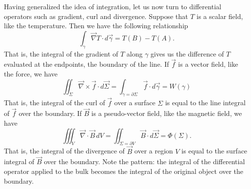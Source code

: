 Having generalized the idea of integration, let us now turn to differential operators such as gradient, curl and divergence. Suppose that $T$ is a scalar field, like the temperature. Then we have the following relationship
\begin{equation}\label{rp-cm-gradientTheorem}
	\int_{\gamma} \vec{\nabla} T \cdot d\vec{\gamma} = T(B) - T(A).
\end{equation}
That is, the integral of the gradient of $T$ along $\gamma$ gives us the difference of $T$ evaluated at the endpoints, the boundary of the line. If $\vec{f}$ is a vector field, like the force, we have
\begin{equation}\label{rp-cm-curlTheorem}
	\iint_{\Sigma} \vec{\nabla} \times \vec{f} \cdot d\vec{\Sigma} = \int_{\gamma = \partial \Sigma} \vec{f} \cdot d\vec{\gamma} = W(\gamma)
\end{equation}
That is, the integral of the curl of $\vec{f}$ over a surface $\Sigma$ is equal to the line integral of $\vec{f}$ over the boundary. If $\vec{B}$ is a pseudo-vector field, like the magnetic field, we have
\begin{equation}\label{rp-cm-divergenceTheorem}
	\iiint_{V} \vec{\nabla} \cdot \vec{B} \, dV = \iint_{\Sigma = \partial V} \vec{B} \cdot d\vec{\Sigma} = \Phi(\Sigma).
\end{equation}
That is, the integral of the divergence of $\vec{B}$ over a region $V$ is equal to the surface integral of $\vec{B}$ over the boundary. Note the pattern: the integral of the differential operator applied to the bulk becomes the integral of the original object over the boundary.


